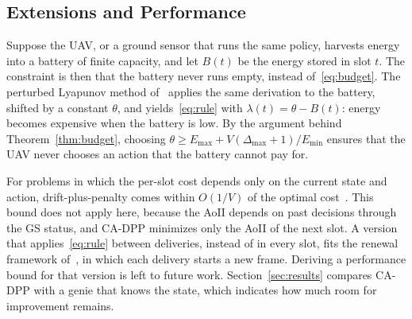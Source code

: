 \subsection{Extensions and Performance}
\begin{remark}\label{rem:harvest}
Suppose the UAV, or a ground sensor that runs the same policy, harvests energy into a battery of finite capacity, and let $B(t)$ be the energy stored in slot $t$. The constraint is then that the battery never runs empty, instead of~\eqref{eq:budget}. The perturbed Lyapunov method of~\cite{huang2013eh} applies the same derivation to the battery, shifted by a constant $\theta$, and yields~\eqref{eq:rule} with $\lambda(t)=\theta-B(t)$: energy becomes expensive when the battery is low. By the argument behind Theorem~\ref{thm:budget}, choosing $\theta\ge E_{\max}+V(\Delta_{\max}+1)/E_{\min}$ ensures that the UAV never chooses an action that the battery cannot pay for.
\end{remark}

\begin{remark}[Optimality]\label{rem:opt}
For problems in which the per-slot cost depends only on the current state and action, drift-plus-penalty comes within $O(1/V)$ of the optimal cost~\cite{neely2010book}. This bound does not apply here, because the AoII depends on past decisions through the GS status, and CA-DPP minimizes only the AoII of the next slot. A version that applies~\eqref{eq:rule} between deliveries, instead of in every slot, fits the renewal framework of~\cite{neely2013renewal}, in which each delivery starts a new frame. Deriving a performance bound for that version is left to future work. Section~\ref{sec:results} compares CA-DPP with a genie that knows the state, which indicates how much room for improvement remains.
\end{remark}
